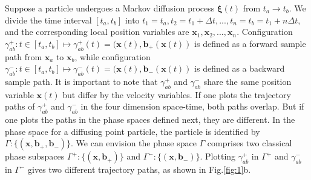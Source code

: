 \documentclass[%
 aip, 
 amsmath,amssymb,amsthm,
 nofootinbib,
 reprint,
]{revtex4-1}
\begin{document}
Suppose a particle undergoes a Markov diffusion process $\mathbf{\xi}(t)$ from $t_a\to t_b$. We divide the time interval $[t_a, t_b]$ into $t_1=t_a, t_2=t_1+\Delta t, ..., t_n=t_b=t_1+n\Delta t$, and the corresponding local position variables are $\mathbf{x}_1, \mathbf{x}_2, ..., \mathbf{x}_n$.  Configuration $\gamma^+_{ab}: t\in [t_a, t_b] \mapsto \gamma^+_{ab}(t) = (\mathbf{x}(t), \mathbf{b_+}(\mathbf{x}(t))$ is defined as a forward sample path from $\mathbf{x}_a$ to $\mathbf{x}_b$, while configuration $\gamma_{ab}^-: t\in [t_a, t_b]\mapsto \gamma^-_{ab}(t) = ( \mathbf{x}(t), \mathbf{b_-}(\mathbf{x}(t))$ is defined as a backward sample path. It is important to note that $\gamma^+_{ab}$ and $\gamma^-_{ab}$ share the same position variable $\mathbf{x}(t)$ but differ by the velocity variables. If one plots the trajectory paths of $\gamma^+_{ab}$ and $\gamma^-_{ab}$ in the four dimension space-time, both paths overlap. But if one plots the paths in the phase spaces defined next, they are different. In the phase space for a diffusing point particle, the particle is identified by $\Gamma: \{(\mathbf{x}, \mathbf{b}_+, \mathbf{b}_-)\}$. We can envision the phase space $\Gamma$ comprises two classical phase subspaces $\Gamma^+: \{(\mathbf{x}, \mathbf{b}_+)\}$ and $\Gamma^-: \{(\mathbf{x}, \mathbf{b}_-)\}$. Plotting $\gamma^+_{ab}$ in $\Gamma^+$ and $\gamma^-_{ab}$ in $\Gamma^-$ gives two different trajectory paths, as shown in Fig.\ref{fig:1}b.
\end{document}

